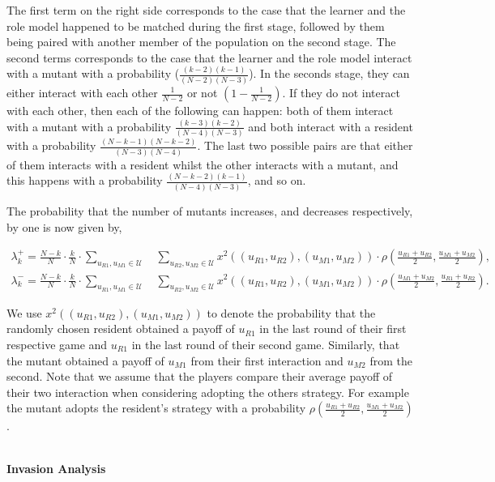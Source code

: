 \documentclass[11pt]{article}
\theoremstyle{plainCl1}
\theoremstyle{plainCl2}
\begin{document}
The first term on the right side corresponds to the case that the learner and
the role model happened to be matched during the first stage,
followed by them being paired with another member of the population on the
second stage. The second terms corresponds to the case that the learner and the
role model interact with a mutant with a probability ($\frac{\left(k - 2\right)
\left(k - 1\right)}{(N\!-\!2)(N\!-\!3)}$). In the seconds stage, they can either
interact with each other $\frac{1}{N - 2}$ or not $(1 - \frac{1}{N - 2})$. If
they do not interact with each other, then each of the following can happen:
both of them interact with a mutant with a probability
$\frac{(k-3)(k-2)}{(N-4)(N-3)}$ and both interact with a resident with a
probability $\frac{(N-k-1)(N-k-2)}{(N-3)(N-4)}$. The last two possible pairs
are that either of them interacts with a resident whilst the other interacts
with a mutant, and this happens with a probability
$\frac{(N-k-2)(k-1)}{(N-4)(N-3)}$, and so on.

The probability that the number of mutants increases, and decreases
respectively, by one is now given by,

\begin{align}\label{eq:ratio_limited}
\lambda^+_k=\frac{N\!-\!k}{N}\cdot \frac{k}{N}\cdot \sum_{u_{R1},u_{M1}\in\mathcal{U}} \quad \sum_{u_{R2},u_{M2}\in\mathcal{U}} x^{2}((u_{R1}, u_{R2}),(u_{M1}, u_{M2}))\cdot \rho\left(\frac{u_{R1} + u_{R2}}{2}, \frac{u_{M1} + u_{M2}}{2}\right), \\
\lambda^-_k=\frac{N\!-\!k}{N}\cdot \frac{k}{N}\cdot \sum_{u_{R1},u_{M1}\in\mathcal{U}} \quad \sum_{u_{R2},u_{M2}\in\mathcal{U}} x^{2}((u_{R1}, u_{R2}),(u_{M1}, u_{M2}))\cdot \rho\left(\frac{u_{M1} + u_{M2}}{2}, \frac{u_{R1} + u_{R2}}{2}\right).
\end{align}

We use $x^{2}((u_{R1}, u_{R2}),(u_{M1}, u_{M2}))$ to denote the probability that
the randomly chosen resident obtained a payoff of $u_{R1}$ in the last round of
their first respective game and $u_{R1}$ in the last round of their second game.
Similarly, that the mutant obtained a payoff of $u_{M1}$ from their first
interaction and $u_{M2}$ from the second. Note that we assume that the players
compare their average payoff of their two interaction when considering adopting
the others strategy. For example the mutant adopts the resident's strategy with
a probability $\rho\left(\frac{u_{R1} + u_{R2}}{2}, \frac{u_{M1} +
u_{M2}}{2}\right)$.

~\\
{\bf Invasion Analysis}
\end{document}
